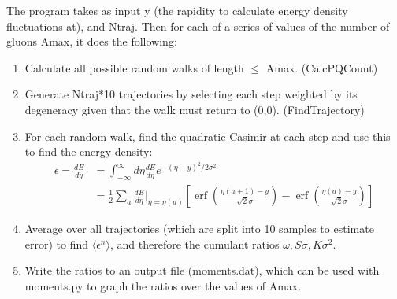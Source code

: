 \documentclass{article}
\DeclareMathOperator\erf{erf}
\begin{document}
The program takes as input y (the rapidity to calculate energy density fluctuations at), and Ntraj. Then for each of a series of values of the number of gluons Amax, it does the following:
\begin{enumerate}
  \item Calculate all possible random walks of length $\leq$ Amax. (CalcPQCount)
  \item Generate Ntraj*10 trajectories by selecting each step weighted by its degeneracy given that the walk must return to (0,0). (FindTrajectory)
  \item For each random walk, find the quadratic Casimir at each step and use this to find the energy density:
  \begin{align*}
  \epsilon = \frac{dE}{dy} &= \int_{-\infty}^{\infty} d\eta \frac{dE}{d\eta} e^{-(\eta-y)^2/2\sigma^2}  \\ 
  &= \frac{1}{2} \sum_a \frac{dE}{d\eta}\Bigr\rvert_{\eta=\eta(a)} \left[ \erf\left(\frac{\eta(a+1)-y}{\sqrt{2}\sigma}\right) - \erf\left(\frac{\eta(a)-y}{\sqrt{2}\sigma}\right)\right]
  \end{align*}
  \item Average over all trajectories (which are split into 10 samples to estimate error) to find $\langle\epsilon^n\rangle$, and therefore the cumulant ratios $\omega, S\sigma, K\sigma^2$.
  \item Write the ratios to an output file (moments.dat), which can be used with moments.py to graph the ratios over the values of Amax.
\end{enumerate}
\end{document}
